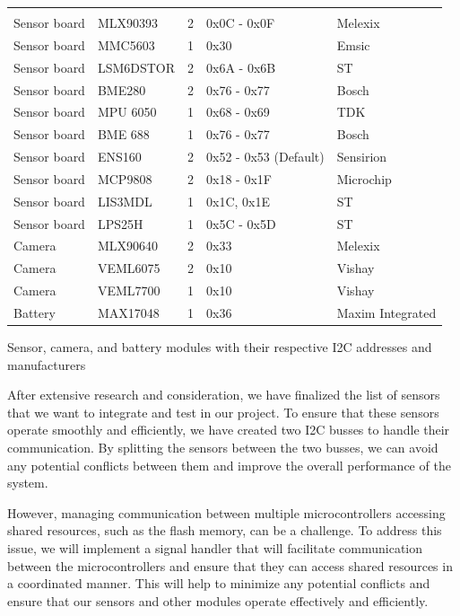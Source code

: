 \documentclass[11pt]{article}
\begin{document}
\begin{table}[htbp]
\centering
{} %
\begin{tabular}{>{\centering\arraybackslash}m{3cm}>{\centering\arraybackslash}llll}
\hline
\rowcolor{DeepSkyBlue4}
\textbf{\color{white!50}{Module}} & \textbf{\color{white}{Sensor}} & \textbf{\color{white}{I2C Bus}} & \textbf{\color{white}{I2C Address}} & \textbf{\color{white}{Manufacturer}} \\
Sensor board & MLX90393 & 2 & 0x0C - 0x0F & Melexix \\
Sensor board & MMC5603 & 1 & 0x30 & Emsic \\
Sensor board & LSM6DSTOR & 2 & 0x6A - 0x6B & ST \\
Sensor board & BME280 & 2 & 0x76 - 0x77 & Bosch \\
Sensor board & MPU 6050 & 1 & 0x68 - 0x69 & TDK \\
Sensor board & BME 688 & 1 & 0x76 - 0x77 & Bosch \\
Sensor board & ENS160 & 2 & 0x52 - 0x53 (Default) & Sensirion \\
Sensor board & MCP9808 & 2 & 0x18 - 0x1F & Microchip \\
Sensor board & LIS3MDL & 1 & 0x1C, 0x1E & ST \\
Sensor board & LPS25H & 1 & 0x5C - 0x5D & ST \\
Camera & MLX90640 & 2 & 0x33 & Melexix \\
Camera & VEML6075 & 2 & 0x10 & Vishay \\
Camera & VEML7700 & 1 & 0x10 & Vishay \\
Battery & MAX17048 & 1 & 0x36 & Maxim Integrated \\
\end{tabular}
\end{table}
\caption{Sensor, camera, and battery modules with their respective I2C addresses and manufacturers}
\label{tab:sensors}

After extensive research and consideration, we have finalized the list of sensors that we want to integrate and test in our project. To ensure that these sensors operate smoothly and efficiently, we have created two I2C busses to handle their communication. By splitting the sensors between the two busses, we can avoid any potential conflicts between them and improve the overall performance of the system.

However, managing communication between multiple microcontrollers accessing shared resources, such as the flash memory, can be a challenge. To address this issue, we will implement a signal handler that will facilitate communication between the microcontrollers and ensure that they can access shared resources in a coordinated manner. This will help to minimize any potential conflicts and ensure that our sensors and other modules operate effectively and efficiently.
\end{document}
